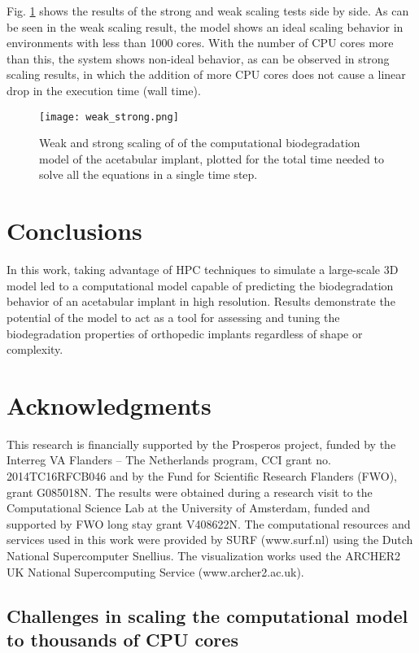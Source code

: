 Fig. \ref{fig:cup_weak_strong} shows the results of the strong and weak scaling tests side by side. As can be seen in the weak scaling result, the model shows an ideal scaling behavior in environments with less than \num{1000} cores. With the number of CPU cores more than this, the system shows non-ideal behavior, as can be observed in strong scaling results, in which the addition of more CPU cores does not cause a linear drop in the execution time (wall time).


\begin{figure}[h]
\centering
\medskip
\texttt{[image: weak\_strong.png]}
\caption[Weak and strong scaling of of the acetabular implant model]{Weak and strong scaling of of the computational biodegradation model of the acetabular implant, plotted for the total time needed to solve all the equations in a single time step.} \label{fig:cup_weak_strong}
\end{figure}

\section{Conclusions}

In this work, taking advantage of HPC techniques to simulate a large-scale 3D model led to a computational model capable of predicting the biodegradation behavior of an acetabular implant in high resolution. Results demonstrate the potential of the model to act as a tool for assessing and tuning the biodegradation properties of orthopedic  implants regardless of shape or complexity.

\section{Acknowledgments}

This research is financially supported by the Prosperos project, funded by the Interreg VA Flanders – The Netherlands program, CCI grant no. 2014TC16RFCB046 and by the Fund for Scientific Research Flanders (FWO), grant G085018N. The results were obtained during a research visit to the Computational Science Lab at the University of Amsterdam, funded and supported by FWO long stay grant V408622N. The computational resources and services used in this work were provided by SURF (www.surf.nl) using the Dutch National Supercomputer Snellius. The visualization works used the ARCHER2 UK National Supercomputing Service (www.archer2.ac.uk).


\begin{subappendices}

\section{Challenges in scaling the computational model to thousands of CPU cores}


\end{subappendices}


\cleardoublepage

